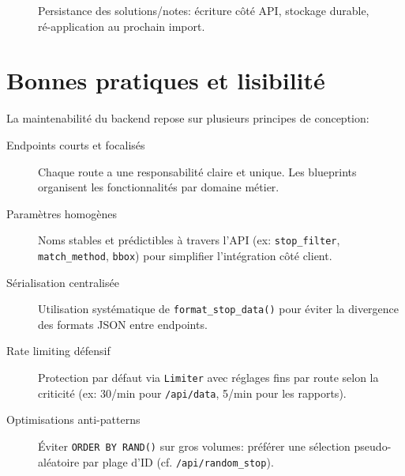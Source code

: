 \begin{figure}[H]
  \centering
  \caption{Persistance des solutions/notes: écriture côté API, stockage durable, ré-application au prochain import.}
\end{figure}

\section{Bonnes pratiques et lisibilité}

La maintenabilité du backend repose sur plusieurs principes de conception:

\begin{description}
  \item[Endpoints courts et focalisés] Chaque route a une responsabilité claire et unique. Les blueprints organisent les fonctionnalités par domaine métier.
  
  \item[Paramètres homogènes] Noms stables et prédictibles à travers l'API (ex: \texttt{stop\_filter}, \texttt{match\_method}, \texttt{bbox}) pour simplifier l'intégration côté client.
  
  \item[Sérialisation centralisée] Utilisation systématique de \texttt{format\_stop\_data()} pour éviter la divergence des formats JSON entre endpoints.
  
  \item[Rate limiting défensif] Protection par défaut via \texttt{Limiter} avec réglages fins par route selon la criticité (ex: 30/min pour \texttt{/api/data}, 5/min pour les rapports).
  
  \item[Optimisations anti-patterns] Éviter \texttt{ORDER BY RAND()} sur gros volumes: préférer une sélection pseudo-aléatoire par plage d'ID (cf. \texttt{/api/random\_stop}).
\end{description}

